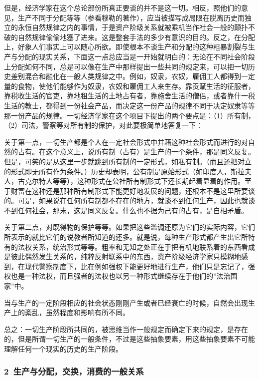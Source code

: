 \documentclass[a4paper,twoside,12pt,AutoFakeBold]{ctexart}
\begin{document}
但是，经济学家在这个总论部份所真正要谈的并不是这一切。相反，照他们的意见，生产不同于分配等等（参看穆勒的著作），应当被描写成局限在脱离历史而独立的永恒自然规律之内的事情，于是资产阶级关系就被乘机当作社会一般的颠扑不破的自然规律偷偷地塞了进来。这是整套手法的多少有意识的目的。反之，在分配上，好象人们事实上可以随心所欲。即使根本不谈生产和分配的这种粗暴割裂与生产与分配的现实关系，下面这一点总应当是一开始就明白的：无论在不同社会阶段上分配如何不同，总是可以像在生产中那样提出一些共同的规定来，可以把一切历史差别混合和融化在一般人类规律之中。例如，奴隶，农奴，雇佣工人都得到一定量的食物，使他们能够作为奴隶，农奴和雇佣工人来生存。靠贡赋生活的征服者，靠税收生活的官吏，靠地租生活的土地占有者，靠施舍生活的僧侣，或者靠什一税生活的教士，都得到一份社会产品，而决定这一份产品的规律不同于决定奴隶等等那一份产品的规律。一切经济学家在这个项目下提出的两个要点是：（1）所有制，（2）司法，警察等对所有制的保护，对此要极简单地答复一下：

关于第一点，一切生产都是个人在一定社会形式中并藉这种社会形式而进行的对自然的占有。在这个意义上，说所有制（占有）是生产的一个条件，那是同义反复。但是，可笑的是从这里一步就跳到所有制的一定形式，如私有制。（而且还把对立的形式即无所有作为条件。）历史却表明，公有制是原始形式（如印度人，斯拉夫人，古克尔特人等等），这种形式在公社所有制形式下还长期起着显着的作用。至于财富在这种还是那种所有制形式下能更好地发展的问题，还根本不是这里所要谈的。可是，如果说在任何所有制都不存在的地方，就谈不到任何生产，因此也就谈不到任何社会，那末，这是同义反复。什么也不据为己有的占有，是自相矛盾。

关于第二点，对既得物的保护等等。如果把这些滥调还原为它们的实际内容，它们所表示的就比它们的说教者所知道的还多。就是说，每种生产形式都产生出它所特有的法权关系，统治形式等等。粗率和无知之处正在于把有机地联系着的东西看成是彼此偶然发生关系的，纯粹反射联系中的东西，资产阶级经济学家只模糊地感到，在现代警察制度下，比在例如强权下能更好地进行生产，他们只是忘记了，强权也是一种法权，而且强者的法权也以另一种形式继续存在于他们的”法治国家”中。

当与生产的一定阶段相应的社会状态刚刚产生或者已经衰亡的时候，自然会出现生产上的紊乱，虽然程度和影响有所不同。

总之：一切生产阶段所共同的，被思维当作一般规定而确定下来的规定，是存在的，但是所谓一切生产的一般条件，不过是这些抽象要素，用这些抽象要素不可能理解任何一个现实的历史的生产阶段。

\subsubsection{2~生产与分配，交换，消费的一般关系}
\end{document}
